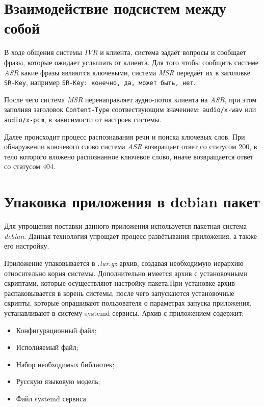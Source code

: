 \section{Взаимодействие подсистем между собой}
В ходе общения системы \textit{IVR} и клиента, система задаёт вопросы и сообщает фразы,
которые ожидает услышать от клиента. Для того чтобы сообщить системе \textit{ASR}
какие фразы являются ключевыми, система \textit{MSR} передаёт их в заголовке \texttt{SR-Key},
например \texttt{SR-Key: конечно, да, может быть, нет}.

После чего система \textit{MSR} перенаправляет аудио-поток клиента на \textit{ASR},
при этом заполняя заголовок \texttt{Content-Type} соотвествующим \linebreak
значением: \texttt{audio/x-wav} или \texttt{audio/x-pcm}, в зависимости от
настроек \linebreak системы.

Далее происходит процесс распознавания речи и поиска ключевых слов. При обнаружении
ключевого слово система \textit{ASR} возвращает ответ со статусом 200, в тело которого
вложено распознанное ключевое слово, иначе возвращается ответ со статусом 404.

\section{Упаковка приложения в debian пакет}

Для упрощения поставки данного приложения используется пакетная система \textit{debian}.
Данная технология упрощает процесс развётывания приложения, а также его настройку.

Приложение упаковывается в \textit{.tar.gz} архив, создавая необходимую иерархию
относительно корня системы. Дополнительно имеется архив с установочными скриптами,
которые осуществляют настройку пакета.При установке архив распаковывается
в корень системы, после чего запускаются установочные скрипты, которые
опрашивают пользователя о параметрах запуска приложения, устанавливают в систему
systemd сервисы. Архив с приложением содержит:
\begin{itemize}
    \item Конфигурационный файл;
    \item Исполняемый файл;
    \item Набор необходимых библиотек;
    \item Русскую языковую модель;
    \item Файл systemd сервиса.
\end{itemize}
